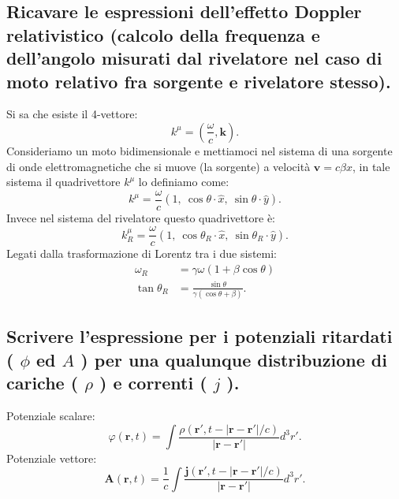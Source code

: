 \subsection[]{Ricavare le espressioni dell’effetto Doppler relativistico (calcolo della frequenza e dell’angolo misurati dal rivelatore nel caso di moto relativo fra sorgente e rivelatore stesso).}
\label{sec:3.a.9}
Si sa che esiste il 4-vettore:
\[
	k^{\mu}=\left( \frac{\omega}{c}, \boldsymbol{k} \right) 
.\]
Consideriamo un moto bidimensionale e mettiamoci nel sistema di una sorgente di onde elettromagnetiche che si muove (la sorgente) a velocità $\boldsymbol{v} =c\beta \hat{x}$, in tale sistema il quadrivettore $k^{\mu}$ lo definiamo come:
\[
	k^{\mu}=\frac{\omega}{c}\left( 1, \ \cos\theta \cdot \hat{x}, \ \sin\theta\cdot  \hat{y} \right) 
.\] 
Invece nel sistema del rivelatore questo quadrivettore è:
\[
	k^{\mu}_{R} = \frac{\omega}{c}\left( 1, \ \cos\theta_{R}\cdot \hat{x}, \ \sin\theta_{R} \cdot \hat{y} \right) 
.\] 
Legati dalla trasformazione di Lorentz tra i due sistemi:
\begin{align*}
	\omega_{R}&=\gamma\omega\left( 1 +\beta\cos\theta \right)\\ 
	\tan\theta_{R}&=\frac{\sin\theta}{\gamma\left( \cos\theta+\beta \right) }
.\end{align*}

\subsection[]{Scrivere l’espressione per i potenziali ritardati ( $\phi$ ed $A$ ) per una qualunque distribuzione di cariche ( $\rho$ ) e correnti ( $j$ ).}
\label{sec:3.b.10}
Potenziale scalare:
\[
	\varphi\left( \boldsymbol{r},t \right) = \int 
	\frac{\rho\left( \boldsymbol{r}', t-\left| \boldsymbol{r}-\boldsymbol{r}' \right| /c  \right) }{\left| \boldsymbol{r}-\boldsymbol{r}' \right| } d^3r'
.\] 
Potenziale vettore:
\[
	\boldsymbol{A}\left( \boldsymbol{r},t \right) =\frac{1}{c}\int 
	\frac{\boldsymbol{j}\left( \boldsymbol{r}', t-\left| \boldsymbol{r}-\boldsymbol{r}' \right| /c  \right) }{\left| \boldsymbol{r}-\boldsymbol{r}' \right| }d^3r'
.\] 

